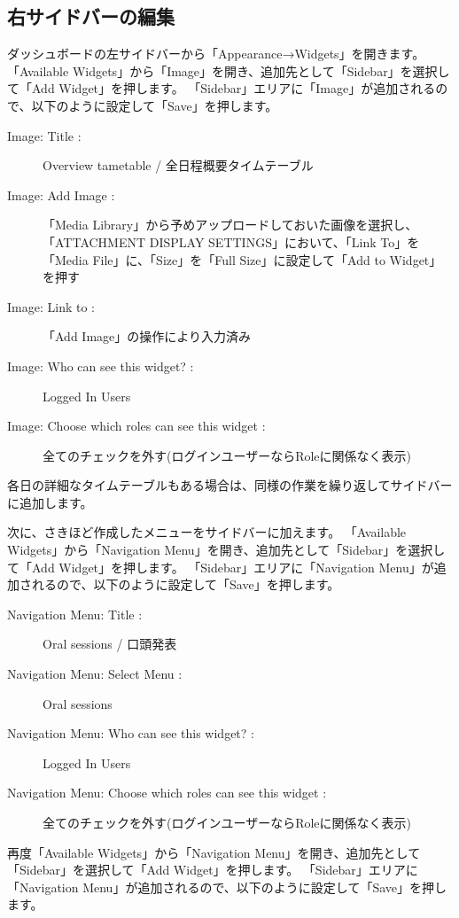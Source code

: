 \documentclass[titlepage,10pt,a4paper,uplatex]{jsbook}
\begin{document}
\subsection{右サイドバーの編集}

ダッシュボードの左サイドバーから「Appearance→Widgets」を開きます。
「Available Widgets」から「Image」を開き、追加先として「Sidebar」を選択して「Add Widget」を押します。
「Sidebar」エリアに「Image」が追加されるので、以下のように設定して「Save」を押します。

\begin{description}
\item[Image: Title : ] Overview tametable / 全日程概要タイムテーブル
\item[Image: Add Image : ] 「Media Library」から予めアップロードしておいた画像を選択し、「ATTACHMENT DISPLAY SETTINGS」において、「Link To」を「Media File」に、「Size」を「Full Size」に設定して「Add to Widget」を押す
\item[Image: Link to : ] 「Add Image」の操作により入力済み
\item[Image: Who can see this widget? : ] Logged In Users
\item[Image: Choose which roles can see this widget : ] 全てのチェックを外す(ログインユーザーならRoleに関係なく表示)
\end{description}

各日の詳細なタイムテーブルもある場合は、同様の作業を繰り返してサイドバーに追加します。

次に、さきほど作成したメニューをサイドバーに加えます。
「Available Widgets」から「Navigation Menu」を開き、追加先として「Sidebar」を選択して「Add Widget」を押します。
「Sidebar」エリアに「Navigation Menu」が追加されるので、以下のように設定して「Save」を押します。

\begin{description}
\item[Navigation Menu: Title : ] Oral sessions / 口頭発表
\item[Navigation Menu: Select Menu : ] Oral sessions
\item[Navigation Menu: Who can see this widget? : ] Logged In Users
\item[Navigation Menu: Choose which roles can see this widget : ] 全てのチェックを外す(ログインユーザーならRoleに関係なく表示)
\end{description}

再度「Available Widgets」から「Navigation Menu」を開き、追加先として「Sidebar」を選択して「Add Widget」を押します。
「Sidebar」エリアに「Navigation Menu」が追加されるので、以下のように設定して「Save」を押します。
\end{document}
